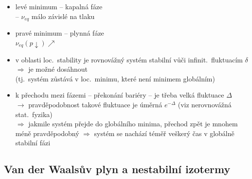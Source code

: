 \begin{itemize}
  \item levé minimum -- kapalná fáze \\
        \hspace*{6em} -- $\nu_{eq}$ málo závislé na tlaku
  \item pravé minimum -- plynná fáze \\
        \hspace*{8em} $\nu_{eq}(p\downarrow)\nearrow$
  \item v oblasti loc.\ stability je rovnovážný systém stabilní vůči infinit.\ fluktuacím $\delta$ \\
        $\Rightarrow$ je možné dosáhnout  \\
        {\color{NavyBlue}\small (tj.\ systém zůstává v loc.\ minimu, které není minimem globálním)}
\end{itemize}

\begin{itemize}
  \item k přechodu mezi fázemi -- překonání bariéry -- je třeba velká fluktuace $\Delta$ \\
  $\to$ pravděpodobnost takové fluktuace je úměrná $e^{-\Delta}$ (viz nerovnovážná stat.\ fyzika) \\
  $\Rightarrow$ jakmile systém přejde do globálního minima, přechod zpět je mnohem méně pravděpodobný
  $\Rightarrow$ systém se nachází téměř veškerý čas v globálně stabilní fázi
\end{itemize}

\subsection{Van der Waalsův plyn a nestabilní izotermy}

